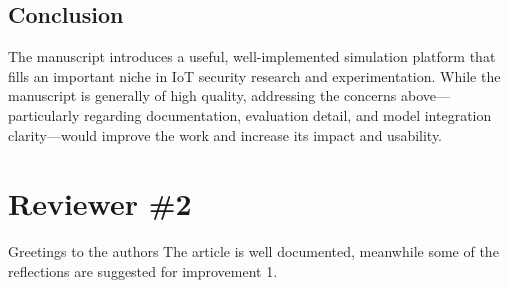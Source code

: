 \documentclass[12pt, a4paper]{article}
\begin{document}
\subsection*{Conclusion}
The manuscript introduces a useful, well-implemented simulation platform that fills an important niche in IoT security research and experimentation. While the manuscript is generally of high quality, addressing the concerns above—particularly regarding documentation, evaluation detail, and model integration clarity—would improve the work and increase its impact and usability.

\newpage

\section*{Reviewer \#2}
Greetings to the authors The article is well documented, meanwhile some of the reflections are suggested for improvement 1.
\end{document}
